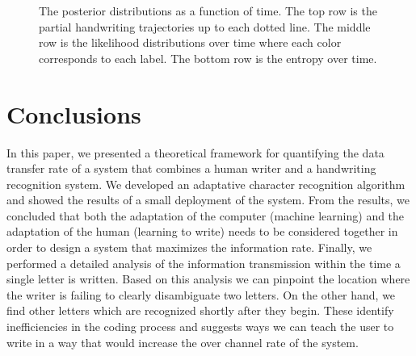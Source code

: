 \documentclass{sigchi}
\begin{document}
\begin{figure}
\begin{subfigure}[b]{0.25\textwidth}
    \caption{}
    \label{fig:entropy_y}
  \end{subfigure}
  \caption{The posterior distributions as a function of time. The top
    row is the partial handwriting trajectories up to each dotted
    line. The middle row is the likelihood distributions over time
    where each color corresponds to each label. The bottom row is the
    entropy over time. }
  \label{fig:entropy}
\end{figure}


\section{Conclusions}
\label{sec:conclusions}

In this paper, we presented a theoretical framework for quantifying
the data transfer rate of a system that combines a human writer and a
handwriting recognition system. We developed an adaptative character
recognition algorithm and showed the results of a small deployment of
the system. From the results, we concluded that both the adaptation of
the computer (machine learning) and the adaptation of the human
(learning to write) needs to be considered together in order to design
a system that maximizes the information rate. Finally, we performed a
detailed analysis of the information transmission within the time a
single letter is written. Based on this analysis we can pinpoint the
location where the writer is failing to clearly disambiguate two
letters. On the other hand, we find other letters which are recognized
shortly after they begin. These identify inefficiencies in the coding
process and suggests ways we can teach the user to write in a way that
would increase the over channel rate of the system.




%
%
%
%
%
\balance



\end{document}
